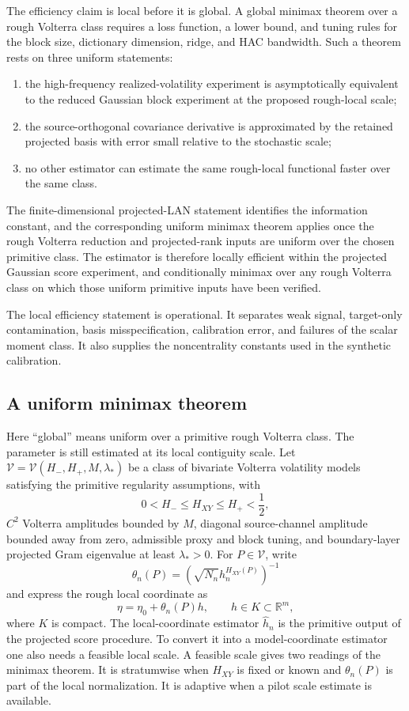 \documentclass[11pt,a4paper]{amsart}
\theoremstyle{plain}
\theoremstyle{definition}
\theoremstyle{remark}
\newcommand{\R}{\mathbb{R}}
\begin{document}
The efficiency claim is local before it is global.  A global minimax theorem over a
rough Volterra class requires a loss function, a lower bound, and tuning rules for the block size,
dictionary dimension, ridge, and HAC bandwidth.  Such a theorem rests on three uniform statements:
\begin{enumerate}[label=(\roman*)]
\item the high-frequency realized-volatility experiment is asymptotically equivalent to the reduced
Gaussian block experiment at the proposed rough-local scale;
\item the source-orthogonal covariance derivative is approximated by the retained projected basis
with error small relative to the stochastic scale;
\item no other estimator can estimate the same rough-local functional faster over the same class.
\end{enumerate}
The finite-dimensional projected-LAN statement identifies the information
constant, and the corresponding uniform minimax theorem applies once the rough Volterra
reduction and projected-rank inputs are uniform over the chosen primitive class.  The estimator is
therefore locally efficient within the projected Gaussian score experiment, and conditionally
minimax over any rough Volterra class on which those uniform primitive inputs have been verified.

The local efficiency statement is operational.  It separates weak signal, target-only
contamination, basis misspecification, calibration error, and failures of the scalar moment class.
It also supplies the noncentrality constants used in the synthetic calibration.

\subsection{A uniform minimax theorem}

Here ``global'' means uniform over a primitive rough Volterra class.  The parameter is still
estimated at its local contiguity scale.  Let
\(\mathcal V=\mathcal V(H_-,H_+,M,\lambda_*)\) be a class of bivariate Volterra volatility models
satisfying the primitive regularity assumptions, with
\[
        0<H_- \le H_{XY}\le H_+<\frac12,
\]
\(C^2\) Volterra amplitudes bounded by \(M\), diagonal source-channel amplitude bounded away from
zero, admissible proxy and block tuning, and boundary-layer projected Gram eigenvalue at least
\(\lambda_*>0\).  For \(P\in\mathcal V\), write
\[
        \theta_n(P)=(\sqrt{N_n}h_n^{H_{XY}(P)})^{-1}
\]
and express the rough local coordinate as
\[
        \eta=\eta_0+\theta_n(P) h,
        \qquad
        h\in K\subset\R^m,
\]
where \(K\) is compact.  The local-coordinate estimator \(\widehat h_n\) is the primitive output of
the projected score procedure.  To convert it into a model-coordinate estimator one also needs
a feasible local scale.  A feasible scale gives two readings of the minimax theorem.  It is
stratumwise when \(H_{XY}\) is fixed or known and \(\theta_n(P)\) is part of the local normalization.
It is adaptive when a pilot scale estimate is available.
\end{document}
